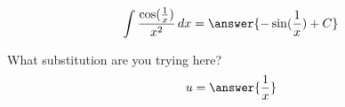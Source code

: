 \documentclass{ximera}
\author{Steven Gubkin}
\begin{document}
\begin{exercise}

\[
\int \frac{\cos(\frac{1}{x})}{x^2} \d x  = \answer{-\sin(\frac{1}{x})+C}
\]
\begin{hint}
	What substitution are you trying here?
	\[ u = \answer{\frac{1}{x}} \]
\end{hint}
\end{exercise}
\end{document}
